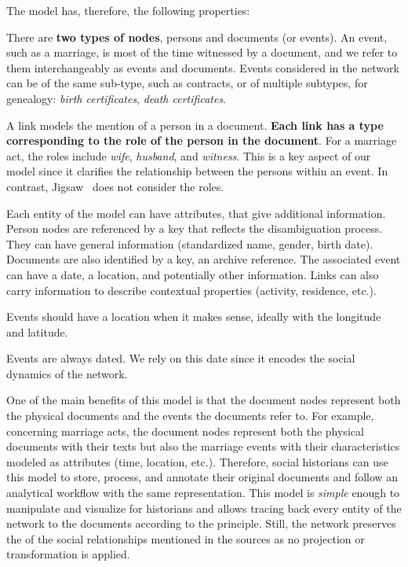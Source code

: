 The model has, therefore, the following properties:
\begin{description}[nosep,leftmargin=2mm]
    \item[{Bipartite:}] There are \textbf{two types of nodes}, persons and documents (or events). An event, such as a marriage, is most of the time witnessed by a document, and we refer to them interchangeably as events and documents. Events considered in the network can be of the same sub-type, such as contracts, or of multiple subtypes, \eg for genealogy: \emph{birth certificates}, \emph{death certificates}.
    \item[Links and Roles:] A link models the mention of a person in a document. \textbf{Each link has a type corresponding to the role of the person in the document}. For a marriage act, the roles include \emph{wife}, \emph{husband}, and \emph{witness}. This is a key aspect of our model since it clarifies the relationship between the persons within an event. In contrast, Jigsaw~\cite{staskoJigsawSupportingInvestigative2008} does not consider the roles.
    \item[{Multivariate:}] Each entity of the model can have attributes, that give additional information. Person nodes are referenced by a key that reflects the disambiguation process. They can have general information (standardized name, gender, birth date). Documents are also identified by a key, \eg an archive reference. The associated event can have a date, a location, and potentially other information. Links can also carry information to describe contextual properties (activity, residence, etc.).
    \item[{Geolocated:}] Events should have a location when it makes sense, ideally with the longitude and latitude.
    \item[{Dynamic:}] Events are always dated. We rely on this date since it encodes the social dynamics of the network.
\end{description}

One of the main benefits of this model is that the document nodes represent both the physical documents and the events the documents refer to.
For example, concerning marriage acts, the document nodes represent both the physical documents with their texts but also the marriage events with their characteristics modeled as attributes (time, location, etc.).
Therefore, social historians can use this model to store, process, and annotate their original documents and follow an analytical workflow with the same representation.
This model is \textit{simple} enough to manipulate and visualize for historians and allows tracing back every entity of the network to the documents according to the \traceability principle.
Still, the network preserves the \reality of the social relationships mentioned in the sources as no projection or transformation is applied.

